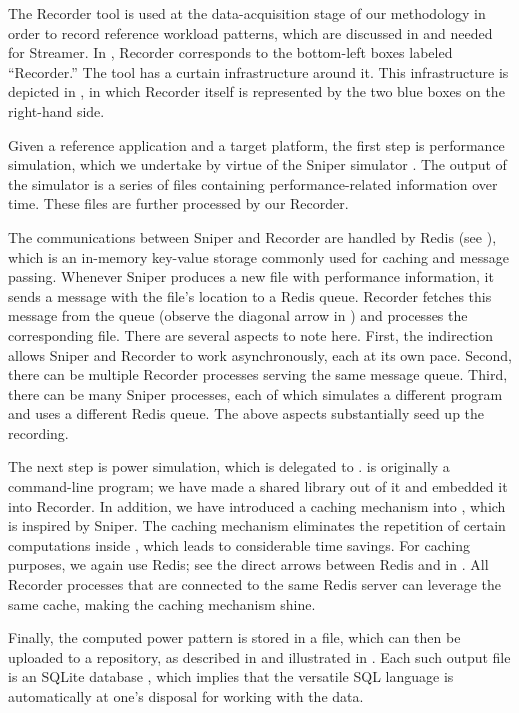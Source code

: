 
The Recorder tool is used at the data-acquisition stage of our methodology in
order to record reference workload patterns, which are discussed in
 and needed for Streamer. In , Recorder
corresponds to the bottom-left boxes labeled ``Recorder.'' The tool has a
curtain infrastructure around it. This infrastructure is depicted in
, in which Recorder itself is represented by the two blue boxes
on the right-hand side.

Given a reference application and a target platform, the first step is
performance simulation, which we undertake by virtue of the Sniper simulator
\cite{carlson2011}. The output of the simulator is a series of files containing
performance-related information over time. These files are further processed by
our Recorder.

The communications between Sniper and Recorder are handled by Redis \cite{redis}
(see ), which is an in-memory key-value storage commonly used for
caching and message passing. Whenever Sniper produces a new file with
performance information, it sends a message with the file's location to a Redis
queue. Recorder fetches this message from the queue (observe the diagonal arrow
in ) and processes the corresponding file. There are several
aspects to note here. First, the indirection allows Sniper and Recorder to work
asynchronously, each at its own pace. Second, there can be multiple Recorder
processes serving the same message queue. Third, there can be many Sniper
processes, each of which simulates a different program and uses a different
Redis queue. The above aspects substantially seed up the recording.

The next step is power simulation, which is delegated to 
\cite{li2009}.  is originally a command-line program; we have made a
shared library out of it and embedded it into Recorder. In addition, we have
introduced a caching mechanism into , which is inspired by Sniper. The
caching mechanism eliminates the repetition of certain computations inside
, which leads to considerable time savings. For caching purposes, we
again use Redis; see the direct arrows between Redis and  in
. All Recorder processes that are connected to the same Redis
server can leverage the same cache, making the caching mechanism shine.

Finally, the computed power pattern is stored in a file, which can then be
uploaded to a repository, as described in  and illustrated in
. Each such output file is an SQLite database \cite{sqlite},
which implies that the versatile SQL language is automatically at one's disposal
for working with the data.
